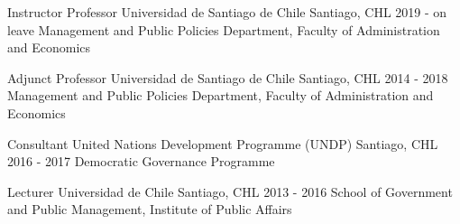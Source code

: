 





\begin{cventries}
\cventry
{Instructor Professor} 
{Universidad de Santiago de Chile} 
{Santiago, CHL} 
{2019 - on leave}
{Management and Public Policies Department, Faculty of Administration and Economics} \vspace{1.5mm}

\cventry
{Adjunct Professor} 
{Universidad de Santiago de Chile} 
{Santiago, CHL} 
{2014 - 2018}
{Management and Public Policies Department, Faculty of Administration and Economics} \vspace{1.5mm}

\cventry
{Consultant} 
{United Nations Development Programme (UNDP)} 
{Santiago, CHL} 
{2016 - 2017}
{Democratic Governance Programme} \vspace{1.5mm}

\cventry
{Lecturer} 
{Universidad de Chile} 
{Santiago, CHL} 
{2013 - 2016}
{School of Government and Public Management, Institute of Public Affairs}\vspace{1.5mm}
\end{cventries}
